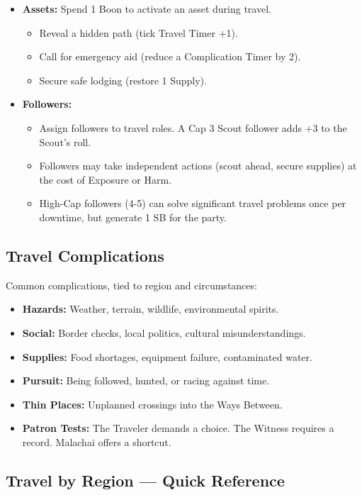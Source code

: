 \begin{itemize}
\item \textbf{Assets:} Spend 1 Boon to activate an asset during travel.
  \begin{itemize}
  \item Reveal a hidden path (tick Travel Timer +1).
  \item Call for emergency aid (reduce a Complication Timer by 2).
  \item Secure safe lodging (restore 1 Supply).
  \end{itemize}
\item \textbf{Followers:}
  \begin{itemize}
  \item Assign followers to travel roles. A Cap 3 Scout follower adds +3 to the Scout's roll.
  \item Followers may take independent actions (scout ahead, secure supplies) at the cost of Exposure or Harm.
  \item High-Cap followers (4-5) can solve significant travel problems once per downtime, but generate 1 SB for the party.
  \end{itemize}
\end{itemize}

\subsection*{Travel Complications}
\label{sec:travel-complications}

Common complications, tied to region and circumstances:

\begin{itemize}
\item \textbf{Hazards:} Weather, terrain, wildlife, environmental spirits.
\item \textbf{Social:} Border checks, local politics, cultural misunderstandings.
\item \textbf{Supplies:} Food shortages, equipment failure, contaminated water.
\item \textbf{Pursuit:} Being followed, hunted, or racing against time.
\item \textbf{Thin Places:} Unplanned crossings into the Ways Between.
\item \textbf{Patron Tests:} The Traveler demands a choice. The Witness requires a record. Malachai offers a shortcut.
\end{itemize}

\subsection*{Travel by Region — Quick Reference}
\label{sec:travel-by-region}

